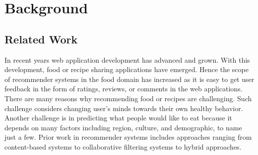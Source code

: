 \chapter{Background}
\label{ch:background}
\section{Related Work}

In recent years web application development has advanced and grown. With this development, food or recipe sharing applications have emerged. Hence the scope of recommender systems in the food domain has increased as it is easy to get user feedback in the form of ratings, reviews, or comments in the web applications.
\\
\noindent There are many reasons why recommending food or recipes are challenging. Such challenge considers changing user's minds towards their own healthy behavior. Another challenge is in predicting what people would like to eat because it depends on many factors including region, culture, and demographic, to name just a few. Prior work in recommender systems includes approaches ranging from content-based systems to collaborative filtering systems to hybrid approaches.
\\

